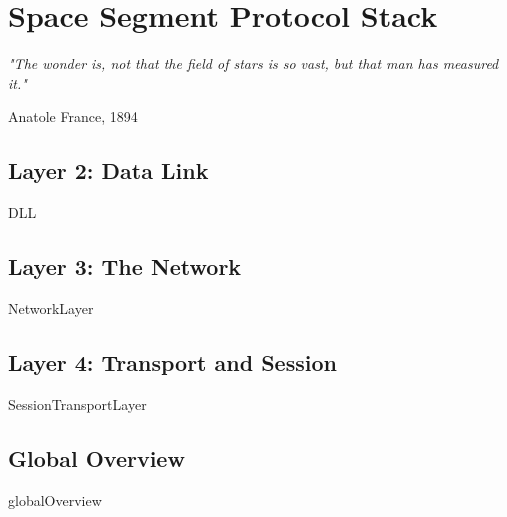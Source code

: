 \chapter{Space Segment Protocol Stack}

%

\epigraph{\textit{"The wonder is, not that the field of stars is so vast, but that man has measured it."}}{Anatole France, 1894} 



\section{Layer 2: Data Link}
{DLL}

\section{Layer 3: The Network}
{NetworkLayer}

\section{Layer 4: Transport and Session}
{SessionTransportLayer}

\section{Global Overview}
{globalOverview}